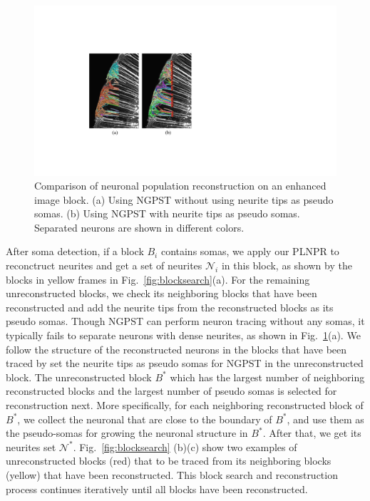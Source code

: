 \begin{figure}[t]
	\centering
	\includegraphics[width=1\columnwidth]{./Illustrations/ngpst_pseudosoma.pdf}
	\caption{Comparison of neuronal population reconstruction on an enhanced image block. (a) Using NGPST without using neurite tips as pseudo somas. 	(b) Using NGPST with neurite tips as pseudo somas. Separated neurons are shown in different colors.  }
	\label{fig:ngpst_pseudosoma}
\end{figure}

%
After soma detection, if a block $B_{i}$ contains somas, we apply our PLNPR to reconctruct neurites and get a set of neurites $\mathcal{N}_{i}$ in this block, as shown by the blocks in yellow frames in Fig.~\ref{fig:blocksearch}(a).
%
For the remaining unreconstructed blocks, we check its neighboring blocks that have been reconstructed and add the neurite tips from the reconstructed blocks as its pseudo somas. 
%
Though NGPST can perform neuron tracing without any somas, it typically fails to separate neurons with dense neurites, as shown in Fig.~\ref{fig:ngpst_pseudosoma}(a).
%
We follow the structure of the reconstructed neurons in the blocks that have been traced by set the neurite tips as pseudo somas for NGPST in the unreconstructed block.
%
The unreconstructed block $B^*$ which has the largest number of neighboring reconstructed blocks and the largest number of pseudo somas is selected for reconstruction next.
%
More specifically, for each neighboring reconstructed block of $ B^*$, we collect the neuronal  that are close to the boundary of $ B^* $, and use them as the pseudo-somas for growing the neuronal structure in $B^*$.
After that, we get its neurites set $ \mathcal{N}^* $.
Fig.~\ref{fig:blocksearch} (b)(c) show two examples of unreconstructed blocks (red) that to be traced from its neighboring blocks (yellow) that have been reconstructed. 
%
This block search and reconstruction process continues iteratively until all blocks have been reconstructed.
%

